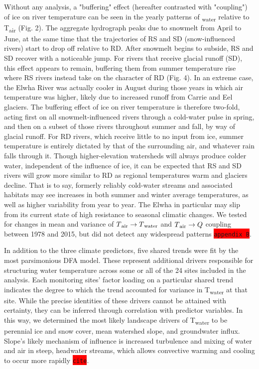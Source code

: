 \documentclass{article}
\begin{document}
Without any analysis, a "buffering" effect (hereafter contrasted with "coupling") of ice on river temperature can be seen in the yearly patterns of \textsubscript{water} relative to T\textsubscript{air} (Fig. 2). The aggregate hydrograph peaks due to snowmelt from April to June, at the same time that the trajectories of RS and SD (snow-influenced rivers) start to drop off relative to RD. After snowmelt begins to subside, RS and SD recover with a noticeable jump. For rivers that receive glacial runoff (SD), this effect appears to remain, buffering them from summer temperature rise where RS rivers instead take on the character of RD (Fig. 4). In an extreme case, the Elwha River was actually cooler in August during those years in which air temperature was higher, likely due to increased runoff from Carrie and Eel glaciers. The buffering effect of ice on river temperature is therefore two-fold, acting first on all snowmelt-influenced rivers through a cold-water pulse in spring, and then on a subset of those rivers throughout summer and fall, by way of glacial runoff. For RD rivers, which receive little to no input from ice, summer temperature is entirely dictated by that of the surrounding air, and whatever rain falls through it. Though higher-elevation watersheds will always produce colder water, independent of the influence of ice, it can be expected that RS and SD rivers will grow more similar to RD as regional temperatures warm and glaciers decline. That is to say, formerly reliably cold-water streams and associated habitats may see increases in both summer and winter average temperatures, as well as higher variability from year to year. The Elwha in particular may slip from its current state of high resistance to seasonal climatic changes. We tested for changes in mean and variance of $T\textsubscript{air}\rightarrow T\textsubscript{water}$ and $T\textsubscript{air}\rightarrow Q$ coupling between 1978 and 2015, but did not detect any widespread patterns \colorbox{red}{\lstinline{appendix B}}.

In addition to the three climate predictors, five shared trends were fit by the most parsimonious DFA model. These represent additional drivers responsible for structuring water temperature across some or all of the 24 sites included in the analysis. Each monitoring sites' factor loading on a particular shared trend indicates the degree to which the trend accounted for variance in T\textsubscript{water} at that site. While the precise identities of these drivers cannot be attained with certainty, they can be inferred through correlation with predictor variables. In this way, we determined the most likely landscape drivers of T\textsubscript{water} to be perennial ice and snow cover, mean watershed slope, and groundwater influx. Slope's likely mechanism of influence is increased turbulence and mixing of water and air in steep, headwater streams, which allows convective warming and cooling to occur more rapidly \colorbox{red}{\lstinline{cite}}.
\end{document}
